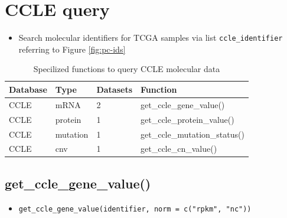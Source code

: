 \documentclass[
]{book}
\newenvironment{Shaded}{\begin{snugshade}}{\end{snugshade}}
\newcommand{\AttributeTok}[1]{\textcolor[rgb]{0.13,0.29,0.53}{#1}}
\newcommand{\FunctionTok}[1]{\textcolor[rgb]{0.13,0.29,0.53}{\textbf{#1}}}
\newcommand{\NormalTok}[1]{#1}
\newcommand{\OtherTok}[1]{\textcolor[rgb]{0.56,0.35,0.01}{#1}}
\newcommand{\SpecialCharTok}[1]{\textcolor[rgb]{0.81,0.36,0.00}{\textbf{#1}}}
\newcommand{\StringTok}[1]{\textcolor[rgb]{0.31,0.60,0.02}{#1}}
\providecommand{\tightlist}{%
  \setlength{\itemsep}{0pt}\setlength{\parskip}{0pt}}
\begin{document}
\section{CCLE query}\label{ccle-query}

\begin{itemize}
\tightlist
\item
  Search molecular identifiers for TCGA samples via list \texttt{ccle\_identifier} referring to Figure \ref{fig:pc-ids}
\end{itemize}

\begin{table}

\caption{\label{tab:query-ccle-func}Specilized functions to query CCLE molecular data}
\centering
\begin{tabular}[t]{llll}
\toprule
Database & Type & Datasets & Function\\
\midrule
CCLE & mRNA & 2 & get\_ccle\_gene\_value()\\
CCLE & protein & 1 & get\_ccle\_protein\_value()\\
CCLE & mutation & 1 & get\_ccle\_mutation\_status()\\
CCLE & cnv & 1 & get\_ccle\_cn\_value()\\
\bottomrule
\end{tabular}
\end{table}

\subsection{get\_ccle\_gene\_value()}\label{get_ccle_gene_value}

\begin{itemize}
\tightlist
\item
  \texttt{get\_ccle\_gene\_value(identifier,\ norm\ =\ c("rpkm",\ "nc"))}
\end{itemize}

\begin{Shaded}
\end{Shaded}
\end{document}
